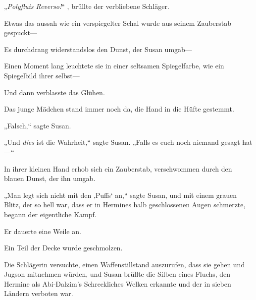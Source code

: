 „\emph{Polyfluis Reverso!}“ , brüllte der verbliebene Schläger.

Etwas das aussah wie ein verspiegelter Schal wurde aus seinem Zauberstab gespuckt—

Es durchdrang widerstandslos den Dunst, der Susan umgab—

Einen Moment lang leuchtete sie in einer seltsamen Spiegelfarbe, wie ein Spiegelbild ihrer selbst—

Und dann verblasste das Glühen.

Das junge Mädchen stand immer noch da, die Hand in die Hüfte gestemmt.

„Falsch,“ sagte Susan.

„Und \emph{dies} ist die Wahrheit,“ sagte Susan. „Falls es euch noch niemand gesagt hat—“

In ihrer kleinen Hand erhob sich ein Zauberstab, verschwommen durch den blauen Dunst, der ihn umgab.

„Man legt sich nicht mit den ‚Puffs‘ an,“ sagte Susan, und mit einem grauen Blitz, der so hell war, dass er in Hermines halb geschlossenen Augen schmerzte, begann der eigentliche Kampf.

Er dauerte eine Weile an.

Ein Teil der Decke wurde geschmolzen.

Die Schlägerin versuchte, einen Waffenstillstand auszurufen, dass sie gehen und Jugson mitnehmen würden, und Susan brüllte die Silben eines Fluchs, den Hermine als Abi-Dalzim’s Schreckliches Welken erkannte und der in sieben Ländern verboten war.

